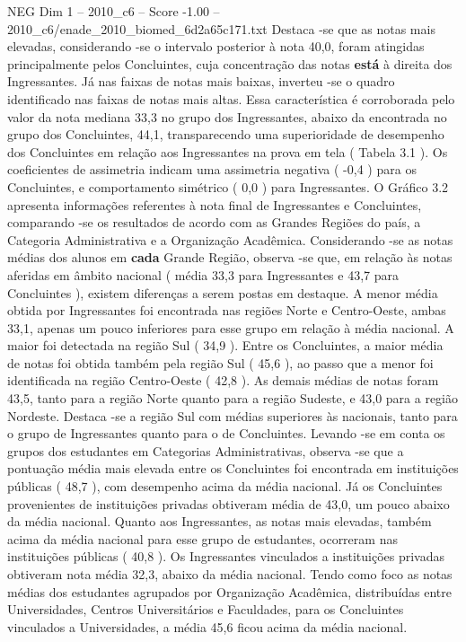 \begin{textsample}{NEG Dim 1 – 2010\_c6 – Score -1.00 – 2010\_c6/enade\_2010\_biomed\_6d2a65c171.txt}
Destaca -se que as notas mais elevadas, considerando -se o intervalo posterior à nota 40,0, foram atingidas principalmente pelos Concluintes, cuja concentração das notas \textbf{está} à direita dos Ingressantes.
Já nas faixas de notas mais baixas, inverteu -se o quadro identificado nas faixas de notas mais altas.
Essa característica é corroborada pelo valor da nota mediana 33,3 no grupo dos Ingressantes, abaixo da encontrada no grupo dos Concluintes, 44,1, transparecendo uma superioridade de desempenho dos Concluintes em relação aos Ingressantes na prova em tela ( Tabela 3.1 ).
Os coeficientes de assimetria indicam uma assimetria negativa ( -0,4 ) para os Concluintes, e comportamento simétrico ( 0,0 ) para Ingressantes.
O Gráfico 3.2 apresenta informações referentes à nota final de Ingressantes e Concluintes, comparando -se os resultados de acordo com as Grandes Regiões do país, a Categoria Administrativa e a Organização Acadêmica.
Considerando -se as notas médias dos alunos em \textbf{cada} Grande Região, observa -se que, em relação às notas aferidas em âmbito nacional ( média 33,3 para Ingressantes e 43,7 para Concluintes ), existem diferenças a serem postas em destaque.
A menor média obtida por Ingressantes foi encontrada nas regiões Norte e Centro-Oeste, ambas 33,1, apenas um pouco inferiores para esse grupo em relação à média nacional.
A maior foi detectada na região Sul ( 34,9 ).
Entre os Concluintes, a maior média de notas foi obtida também pela região Sul ( 45,6 ), ao passo que a menor foi identificada na região Centro-Oeste ( 42,8 ).
As demais médias de notas foram 43,5, tanto para a região Norte quanto para a região Sudeste, e 43,0 para a região Nordeste.
Destaca -se a região Sul com médias superiores às nacionais, tanto para o grupo de Ingressantes quanto para o de Concluintes.
Levando -se em conta os grupos dos estudantes em Categorias Administrativas, observa -se que a pontuação média mais elevada entre os Concluintes foi encontrada em instituições públicas ( 48,7 ), com desempenho acima da média nacional.
Já os Concluintes provenientes de instituições privadas obtiveram média de 43,0, um pouco abaixo da média nacional.
Quanto aos Ingressantes, as notas mais elevadas, também acima da média nacional para esse grupo de estudantes, ocorreram nas instituições públicas ( 40,8 ).
Os Ingressantes vinculados a instituições privadas obtiveram nota média 32,3, abaixo da média nacional.
Tendo como foco as notas médias dos estudantes agrupados por Organização Acadêmica, distribuídas entre Universidades, Centros Universitários e Faculdades, para os Concluintes vinculados a Universidades, a média 45,6 ficou acima da média nacional.

\end{textsample}
